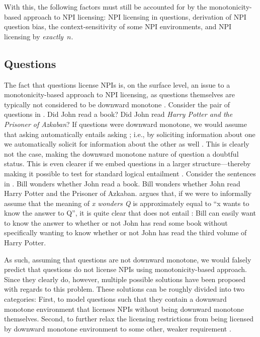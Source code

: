 With this, the following factors must still be accounted for by the monotonicity-based approach to NPI licensing: NPI licensing in questions, derivation of NPI question bias, the context-sensitivity of some NPI environments, and NPI licensing by \textit{exactly~$n$}.

\subsection{Questions}
The fact that questions license NPIs is, on the surface level, an issue to a monotonicity-based approach to NPI licensing, as questions themselves are typically not considered to be downward monotone \parencite{vanRooij2003,Guerzoni2007}. Consider the pair of questions in .
\pex[nopreamble=true]\label{ex:q-monotone}%
\a{} Did John read a book?
\a{} Did John read \textit{Harry Potter and the Prisoner of Azkaban}?
\xe
If questions were downward monotone, we would assume that asking  automatically entails asking ; i.e., by soliciting information about one we automatically solicit for information about the other as well \parencite[p.~366f]{Guerzoni2007}. This is clearly not the case, making the downward monotone nature of question a doubtful status. This is even clearer if we embed questions in a larger structure---thereby making it possible to test for standard logical entailment \parencite[p.~367]{Guerzoni2007}. Consider the sentences in .
\pex[nopreamble=true]\label{ex:embeddedq-monotone}%
\a{} Bill wonders whether John read a book.\label{ex:embeddedq-monotone1}
\a{} Bill wonders whether John read Harry Potter and the Prisoner of Azkaban.\label{ex:embeddedq-monotone2}
\xe
\textcite[p.~367f]{Guerzoni2007} argues that, if we were to informally assume that the meaning of \textit{x wonders Q} is approximately equal to \enquote{x wants to know the answer to Q}, it is quite clear that  does not entail : Bill can easily want to know the answer to whether or not John has read some book without specifically wanting to know whether or not John has read the third volume of Harry Potter. 

As such, assuming that questions are not downward monotone, we would falsely predict that questions do not license NPIs using  monotonicity-based approach. Since they clearly do, however, multiple possible solutions have been proposed with regards to this problem. These solutions can be roughly divided into two categories: First, to model questions such that they contain a downward monotone environment that licenses NPIs without being downward monotone themselves. Second, to further relax the licensing restrictions from being licensed by downward monotone environment to some other, weaker requirement \parencite{Giannakidou1998}.

